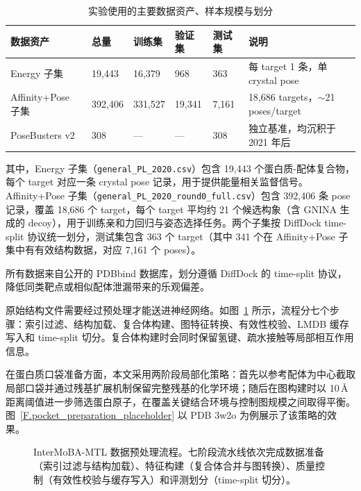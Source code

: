 \begin{table}[htb]
  \centering
  \caption{实验使用的主要数据资产、样本规模与划分}
  \label{T.dataset}
  \scriptsize
  \setlength{\tabcolsep}{4pt}
  \renewcommand{\arraystretch}{1.2}
  \begin{tabular}{p{2.6cm}p{1.6cm}p{1.6cm}p{1.6cm}p{1.6cm}p{2.8cm}}
  \hline
  数据资产 & 总量 & 训练集 & 验证集 & 测试集 & 说明 \\
  \hline
  Energy 子集 & 19{,}443 & 16{,}379 & 968 & 363 & 每 target 1 条，单 crystal pose \\
  Affinity+Pose 子集 & 392{,}406 & 331{,}527 & 19{,}341 & 7{,}161 & 18{,}686 targets，$\sim$21 poses/target \\
  PoseBusters v2 & 308 & --- & --- & 308 & 独立基准，均沉积于 2021 年后 \\
  \hline
  \end{tabular}
\end{table}

其中，Energy 子集（\texttt{general\_PL\_2020.csv}）包含 19{,}443 个蛋白质-配体复合物，每个 target 对应一条 crystal pose 记录，用于提供能量相关监督信号。Affinity+Pose 子集（\texttt{general\_PL\_2020\_round0\_full.csv}）包含 392{,}406 条 pose 记录，覆盖 18{,}686 个 target，每个 target 平均约 21 个候选构象（含 GNINA 生成的 decoy），用于训练亲和力回归与姿态选择任务。两个子集按 DiffDock time-split 协议统一划分\cite{corso2023diffdock}，测试集包含 363 个 target（其中 341 个在 Affinity+Pose 子集中有有效结构数据，对应 7{,}161 个 poses）。

所有数据来自公开的 PDBbind 数据库\cite{wang2004pdbbind,liu2015pdbbind}，划分遵循 DiffDock 的 time-split 协议\cite{corso2023diffdock}，降低同类靶点或相似配体泄漏带来的乐观偏差。

原始结构文件需要经过预处理才能送进神经网络。如图~\ref{F.data_pipeline} 所示，流程分七个步骤：索引过滤、结构加载、复合体构建、图特征转换、有效性校验、LMDB 缓存写入和 time-split 切分。复合体构建时会同时保留氢键、疏水接触等局部相互作用信息\cite{adasme2021plip}。

在蛋白质口袋准备方面，本文采用两阶段局部化策略\cite{lai2024interformer,mcnutt2021gnina}：首先以参考配体为中心截取局部口袋并通过残基扩展机制保留完整残基的化学环境；随后在图构建时以 10\,\AA{} 距离阈值进一步筛选蛋白原子，在覆盖关键结合环境与控制图规模之间取得平衡。图~\ref{F.pocket_preparation_placeholder} 以 PDB 3w2o 为例展示了该策略的效果。

\begin{figure}[htb]
  \centering
  \resizebox{0.52\textwidth}{!}{}
  \caption{InterMoBA-MTL 数据预处理流程。七阶段流水线依次完成数据准备（索引过滤与结构加载）、特征构建（复合体合并与图转换）、质量控制（有效性校验与缓存写入）和评测划分（time-split 切分）。}
  \label{F.data_pipeline}
\end{figure}

